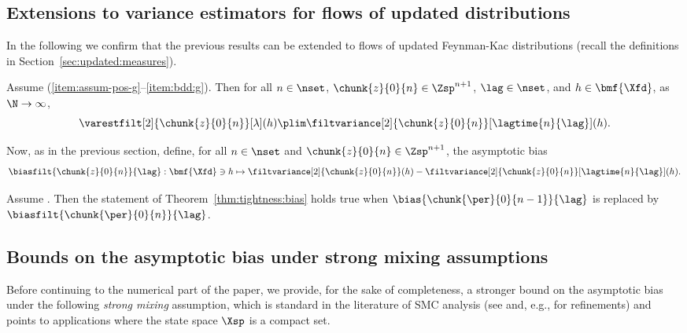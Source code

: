 \subsection{Extensions to variance estimators for flows of updated distributions}

In the following we confirm that the previous results can be extended to flows of updated Feynman-Kac distributions (recall the definitions in Section~\ref{sec:updated:measures}). 

\begin{proposition} \label{prop:consistency:fixed:lag:updated:case}
Assume (\ref{item:assum-pos-g}--\ref{item:bdd:g}). Then for all $n \in \nset$, $\chunk{z}{0}{n} \in \Zsp^{n + 1}$, $\lag \in \nset$, and $h \in \bmf{\Xfd}$, as $\N \rightarrow \infty$, 
$$
\varestfilt[2]{\chunk{z}{0}{n}}[\lambda](h) \plim \filtvariance[2]{\chunk{z}{0}{n}}[\lagtime{n}{\lag}](h). 
$$
\end{proposition}

Now, as in the previous section, define, for all $n \in \nset$ and $\chunk{z}{0}{n} \in \Zsp^{n + 1}$, the asymptotic bias   
\begin{equation} \label{eq:def:bias:filter}
\biasfilt{\chunk{z}{0}{n}}{\lag} : \bmf{\Xfd} \ni h \mapsto \filtvariance[2]{\chunk{z}{0}{n}}(h) - \filtvariance[2]{\chunk{z}{0}{n}}[\lagtime{n}{\lag}](h). 
\end{equation} 

\begin{theorem} \label{thm:tightness:bias:filter}
Assume . Then the statement of Theorem~\ref{thm:tightness:bias} holds true when $\bias{\chunk{\per}{0}{n - 1}}{\lag}$ is replaced by $\biasfilt{\chunk{\per}{0}{n}}{\lag}$. 
\end{theorem}

\subsection{Bounds on the asymptotic bias under strong mixing assumptions}

Before continuing to the numerical part of the paper, we provide, for the sake of completeness, a stronger bound on the asymptotic bias under the following \emph{strong mixing} assumption, which is standard in the literature of SMC analysis (see \cite{delmoral:guionnet:2001} and, e.g., \cite{delmoral:2004,cappe:moulines:ryden:2005,crisan:heine:2008} for refinements) and points to applications where the state space $\Xsp$ is a compact set.   

